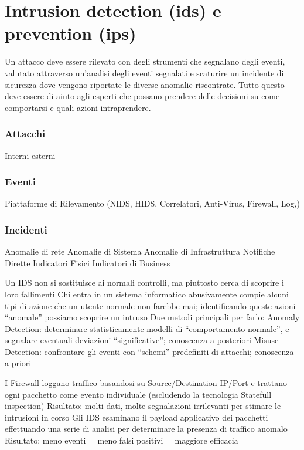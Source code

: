 \chapter{Intrusion detection (ids) e prevention (ips)}  %

Un attacco deve essere rilevato con degli strumenti che segnalano degli eventi, valutato attraverso un'analisi degli eventi segnalati e scaturire un incidente di sicurezza dove vengono riportate le diverse anomalie riscontrate.
Tutto questo deve essere di aiuto agli esperti che possano prendere delle decisioni su come comportarsi e quali azioni intraprendere.

\subsection{Attacchi}
Interni
esterni

\subsection{Eventi}
Piattaforme di Rilevamento
(NIDS, HIDS, Correlatori, Anti-Virus, Firewall, Log,)

\subsection{Incidenti}

Anomalie di rete
Anomalie di Sistema
Anomalie di Infrastruttura
Notifiche Dirette
Indicatori Fisici
Indicatori di Business

Un IDS non si sostituisce ai normali controlli, ma piuttosto cerca di scoprire i loro fallimenti
Chi entra in un sistema informatico abusivamente compie alcuni tipi di azione che un utente normale non farebbe mai; identificando queste azioni “anomale” possiamo scoprire un intruso
Due metodi principali per farlo:
Anomaly Detection: determinare statisticamente modelli di “comportamento normale”, e segnalare eventuali deviazioni “significative”; conoscenza a posteriori
Misuse Detection: confrontare gli eventi con “schemi” predefiniti di attacchi; conoscenza a priori

I Firewall loggano traffico basandosi su Source/Destination IP/Port e trattano ogni pacchetto come evento individuale (escludendo la tecnologia Statefull inspection)
Risultato: molti dati, molte segnalazioni irrilevanti per stimare le intrusioni in corso
Gli IDS esaminano il payload applicativo dei pacchetti effettuando una serie di analisi per determinare la presenza di traffico anomalo
Risultato: meno eventi = meno falsi positivi = maggiore efficacia

